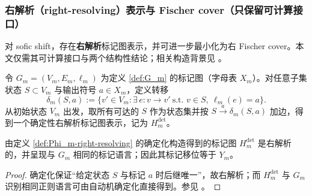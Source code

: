 \subsubsection{右解析（right-resolving）表示与 Fischer cover（只保留可计算接口）}\label{subsubsec:Phi_m-right-resolving-fischer-cover}
对 sofic shift，存在\textbf{右解析}标记图表示，并可进一步最小化为右 Fischer cover。本文仅需其可计算接口与两个结构性结论；相关构造背景见 \cite{LindMarcus1995,Kitchens1998SymbolicDynamics}。

\begin{definition}[右解析表示的确定化口径]\label{def:Phi_m-right-resolving}
令 $G_m=(V_m,E_m,\ell_m)$ 为定义 \ref{def:G_m} 的标记图（字母表 $X_m$）。对任意子集状态 $S\subset V_m$ 与输出符号 $a\in X_m$，定义转移
\[
\delta_m(S,a):=\{v'\in V_m:\exists\,e:v\to v'\ \text{s.t. } v\in S,\ \ell_m(e)=a\}.
\]
从初始状态 $V_m$ 出发，取所有可达的 $S$ 作为状态集并按 $S\xrightarrow{a}\delta_m(S,a)$ 加边，得到一个确定性右解析标记图表示，记为 $H_m^{\mathrm{det}}$。
\end{definition}

\begin{proposition}[右解析表示的存在与等价]\label{prop:Phi_m-right-resolving}
由定义 \ref{def:Phi_m-right-resolving} 的确定化构造得到的标记图 $H_m^{\mathrm{det}}$ 是右解析的，并呈现与 $G_m$ 相同的标记语言；因此其标记移位等于 $Y_m$。
\end{proposition}

\begin{proof}
确定化保证“给定状态 $S$ 与标记 $a$ 时后继唯一”，故右解析；而 $H_m^{\mathrm{det}}$ 与 $G_m$ 识别相同正则语言可由自动机确定化直接得到。参见 \cite{LindMarcus1995,Kitchens1998SymbolicDynamics}。
\end{proof}
